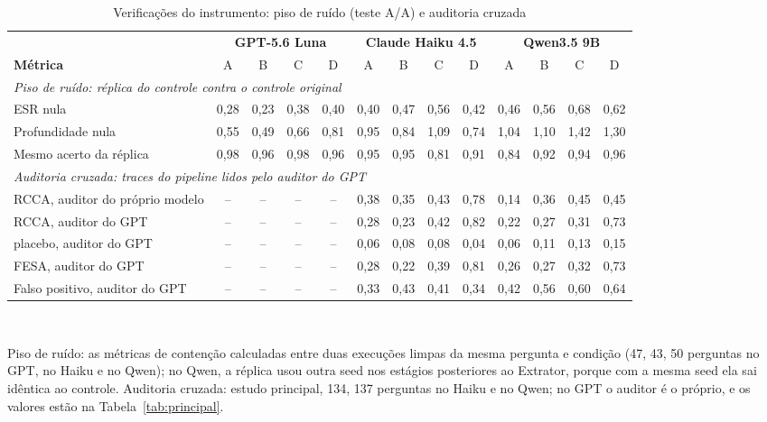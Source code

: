 \begin{table}[t]
\caption{Verificações do instrumento: piso de ruído (teste A/A) e auditoria cruzada}
\label{tab:verificacoes}
\centering
\footnotesize
\setlength{\tabcolsep}{3.2pt}
\begin{tabular}{|l|cccc|cccc|cccc|}
\hline
 & \multicolumn{4}{c|}{\textbf{GPT-5.6 Luna}} & \multicolumn{4}{c|}{\textbf{Claude Haiku 4.5}} & \multicolumn{4}{c|}{\textbf{Qwen3.5 9B}} \\
\textbf{Métrica} & A & B & C & D & A & B & C & D & A & B & C & D \\
\hline
\multicolumn{13}{|l|}{\textit{Piso de ruído: réplica do controle contra o controle original}} \\
ESR nula & 0,28 & 0,23 & 0,38 & 0,40 & 0,40 & 0,47 & 0,56 & 0,42 & 0,46 & 0,56 & 0,68 & 0,62 \\
Profundidade nula & 0,55 & 0,49 & 0,66 & 0,81 & 0,95 & 0,84 & 1,09 & 0,74 & 1,04 & 1,10 & 1,42 & 1,30 \\
Mesmo acerto da réplica & 0,98 & 0,96 & 0,98 & 0,96 & 0,95 & 0,95 & 0,81 & 0,91 & 0,84 & 0,92 & 0,94 & 0,96 \\
\multicolumn{13}{|l|}{\textit{Auditoria cruzada: traces do pipeline lidos pelo auditor do GPT}} \\
RCCA, auditor do próprio modelo & -- & -- & -- & -- & 0,38 & 0,35 & 0,43 & 0,78 & 0,14 & 0,36 & 0,45 & 0,45 \\
RCCA, auditor do GPT & -- & -- & -- & -- & 0,28 & 0,23 & 0,42 & 0,82 & 0,22 & 0,27 & 0,31 & 0,73 \\
\quad placebo, auditor do GPT & -- & -- & -- & -- & 0,06 & 0,08 & 0,08 & 0,04 & 0,06 & 0,11 & 0,13 & 0,15 \\
FESA, auditor do GPT & -- & -- & -- & -- & 0,28 & 0,22 & 0,39 & 0,81 & 0,26 & 0,27 & 0,32 & 0,73 \\
Falso positivo, auditor do GPT & -- & -- & -- & -- & 0,33 & 0,43 & 0,41 & 0,34 & 0,42 & 0,56 & 0,60 & 0,64 \\
\hline
\end{tabular}
\\[2pt]{\scriptsize\raggedright Piso de ruído: as métricas de contenção calculadas entre duas execuções limpas da mesma pergunta e condição (47, 43, 50 perguntas no GPT, no Haiku e no Qwen); no Qwen, a réplica usou outra seed nos estágios posteriores ao Extrator, porque com a mesma seed ela sai idêntica ao controle. Auditoria cruzada: estudo principal, 134, 137 perguntas no Haiku e no Qwen; no GPT o auditor é o próprio, e os valores estão na Tabela~\ref{tab:principal}.\par}
\end{table}
